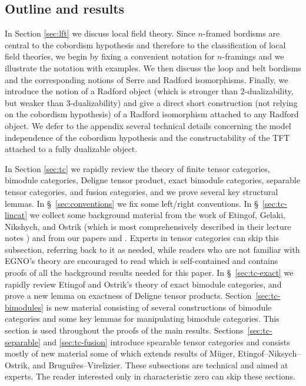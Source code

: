 \documentclass{amsart}
\begin{document}
\subsection*{Outline and results}

In Section \ref{sec:lft} we discuss local field theory.  Since $n$-framed bordisms are central to the cobordism hypothesis and therefore to the classification of local field theories, we begin by fixing a convenient notation for $n$-framings and we illustrate the notation with examples.  We then discuss the loop and belt bordisms and the corresponding notions of Serre and Radford isomorphisms.  Finally, we introduce the notion of a Radford object (which is stronger than $2$-dualizability, but weaker than $3$-dualizability) and give a direct short construction (not relying on the cobordism hypothesis) of a Radford isomorphism attached to any Radford object.  We defer to the appendix several technical details concerning the model independence of the cobordism hypothesis and the constructability of the TFT attached to a fully dualizable object.

In Section \ref{sec:tc} we rapidly review the theory of finite tensor categories, bimodule categories, Deligne tensor product, exact bimodule categories, separable tensor categories, and fusion categories, and we prove several key structural lemmas.   In \S~\ref{sec:conventions} we fix some left/right conventions.  In \S~\ref{sec:tc-lincat} we collect some background material from the work of Etingof, Gelaki, Nikshych, and Ostrik (which is most comprehensively described in their lecture notes \cite{EGNO}) and from our papers \cite{BTP} and \cite{3TC}.  Experts in tensor categories can skip this subsection, referring back to it as needed, while readers who are not familiar with EGNO's theory are encouraged to read \cite{BTP} which is self-contained and contains proofs of all the background results needed for this paper.  In \S~\ref{sec:tc-exact} we rapidly review Etingof and Ostrik's theory of exact bimodule categories, and prove a new lemma on exactness of Deligne tensor products.  Section~\ref{sec:tc-bimodules} is new material consisting of several constructions of bimodule categories and some key lemmas for manipulating bimodule categories.  This section is used throughout the proofs of the main results.  Sections~\ref{sec:tc-separable} and \ref{sec:tc-fusion} introduce spearable tensor categories and consists mostly of new material some of which extends results of M\"uger, Etingof--Niksych--Ostrik, and Brugui\`res--Virelizier.  These subsections are technical and aimed at experts.  The reader interested only in characteristic zero can skip these sections.
\end{document}

